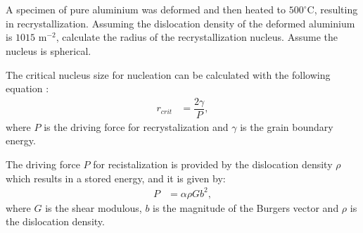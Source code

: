 \newpage
\section{}

A specimen of pure aluminium was deformed and then heated to $500^{\circ}$C, resulting in recrystallization. Assuming the dislocation density of the deformed aluminium is $1015$ m$^{-2}$, calculate the radius of the recrystallization nucleus. Assume the nucleus is spherical.

The critical nucleus size for nucleation can be calculated with the following equation \citet{rollett2017recrystallization}:
\begin{align}
    \label{eq:r_recrystallization}
    r_{crit}&=\dfrac{2\gamma}{P},
\end{align}
where $P$ is the driving force for recrystalization and $\gamma$ is the grain boundary energy.

The driving force $P$ for recistalization is provided by the dislocation density $\rho$ which results in a stored energy, and it is given by:
\begin{align}
    \label{eq:drivin_force}
    P&=\alpha \rho Gb^2,
\end{align}
where $G$ is the shear modulous, $b$ is the magnitude of the Burgers vector and $\rho$ is the dislocation density. 